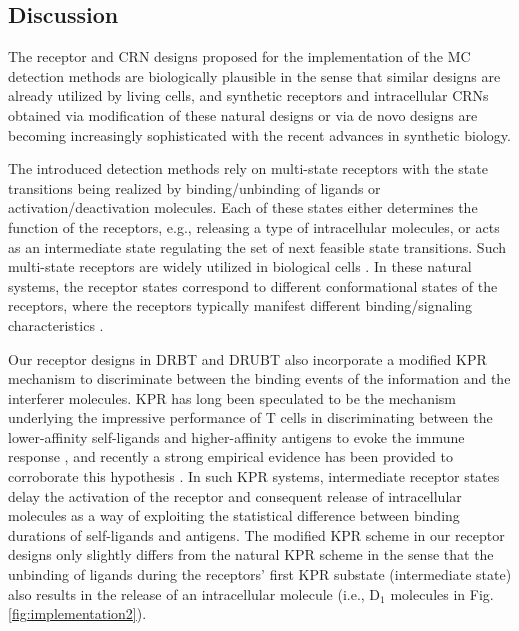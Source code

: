 \documentclass[twocolumn]{IEEEtran}
\begin{document}
\subsection{Discussion}
	The receptor and CRN designs proposed for the implementation of the MC detection methods are biologically plausible in the sense that similar designs are already utilized by living cells, and synthetic receptors and intracellular CRNs obtained via modification of these natural designs or via de novo designs are becoming increasingly sophisticated with the recent advances in synthetic biology. 


The introduced detection methods rely on multi-state receptors with the state transitions being realized by binding/unbinding of ligands or activation/deactivation molecules. Each of these states either determines the function of the receptors, e.g., releasing a type of intracellular molecules, or acts as an intermediate state regulating the set of next feasible state transitions. Such multi-state receptors are widely utilized in biological cells \cite{wong2020tcrbuilder, lau2013conformational}. In these natural systems, the receptor states correspond to different conformational states of the receptors, where the receptors typically manifest different binding/signaling characteristics \cite{kahsai2011multiple}. 

Our receptor designs in DRBT and DRUBT also incorporate a modified KPR mechanism to discriminate between the binding events of the information and the interferer molecules. KPR has long been speculated to be the mechanism underlying the impressive performance of T cells in discriminating between the lower-affinity self-ligands and higher-affinity antigens to evoke the immune response \cite{mckeithan1995kinetic, rabinowitz1996kinetic}, and recently a strong empirical evidence has been provided to corroborate this hypothesis \cite{yousefi2019optogenetic}. In such KPR systems, intermediate receptor states delay the activation of the receptor and consequent release of intracellular molecules as a way of exploiting the statistical difference between binding durations of self-ligands and antigens. The modified KPR scheme in our receptor designs only slightly differs from the natural KPR scheme in the sense that the unbinding of ligands during the receptors' first KPR substate (intermediate state) also results in the release of an intracellular molecule (i.e., D$_1$ molecules in Fig. \ref{fig:implementation2}). 
\end{document}
